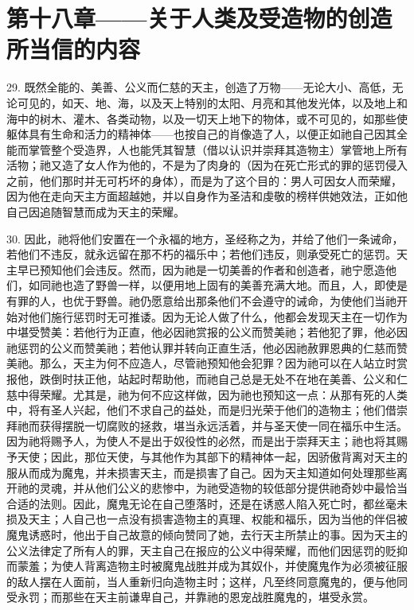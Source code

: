 
\section{第十八章——关于人类及受造物的创造所当信的内容}

29. 既然全能的、美善、公义而仁慈的天主，创造了万物——无论大小、高低，无论可见的，如天、地、海，以及天上特别的太阳、月亮和其他发光体，以及地上和海中的树木、灌木、各类动物，以及一切天上地下的物体，或不可见的，如那些使躯体具有生命和活力的精神体——也按自己的肖像造了人，以便正如祂自己因其全能而掌管整个受造界，人也能凭其智慧（借以认识并崇拜其造物主）掌管地上所有活物；祂又造了女人作为他的，不是为了肉身的（因为在死亡形式的罪的惩罚侵入之前，他们那时并无可朽坏的身体），而是为了这个目的：男人可因女人而荣耀，因为他在走向天主方面超越她，并以自身作为圣洁和虔敬的榜样供她效法，正如他自己因追随智慧而成为天主的荣耀。\par

30. 因此，祂将他们安置在一个永福的地方，圣经称之为，并给了他们一条诫命，若他们不违反，就永远留在那不朽的福乐中；若他们违反，则承受死亡的惩罚。天主早已预知他们会违反。然而，因为祂是一切美善的作者和创造者，祂宁愿造他们，如同祂也造了野兽一样，以便用地上固有的美善充满大地。而且，人，即使是有罪的人，也优于野兽。祂仍愿意给出那条他们不会遵守的诫命，为使他们当祂开始对他们施行惩罚时无可推诿。因为无论人做了什么，他都会发现天主在一切作为中堪受赞美：若他行为正直，他必因祂赏报的公义而赞美祂；若他犯了罪，他必因祂惩罚的公义而赞美祂；若他认罪并转向正直生活，他必因祂赦罪恩典的仁慈而赞美祂。那么，天主为何不应造人，尽管祂预知他会犯罪？因为祂可以在人站立时赏报他，跌倒时扶正他，站起时帮助他，而祂自己总是无处不在地在美善、公义和仁慈中得荣耀。尤其是，祂为何不应这样做，因为祂也预知这一点：从那有死的人类中，将有圣人兴起，他们不求自己的益处，而是归光荣于他们的造物主；他们借崇拜祂而获得摆脱一切腐败的拯救，堪当永远活着，并与圣天使一同在福乐中生活。因为祂将赐予人，为使人不是出于奴役性的必然，而是出于崇拜天主；祂也将其赐予天使；因此，那位天使，与其他作为其部下的精神体一起，因骄傲背离对天主的服从而成为魔鬼，并未损害天主，而是损害了自己。因为天主知道如何处理那些离开祂的灵魂，并从他们公义的悲惨中，为祂受造物的较低部分提供祂奇妙中最恰当合适的法则。因此，魔鬼无论在自己堕落时，还是在诱惑人陷入死亡时，都丝毫未损及天主；人自己也一点没有损害造物主的真理、权能和福乐，因为当他的伴侣被魔鬼诱惑时，他出于自己故意的倾向赞同了她，去行天主所禁止的事。因为天主的公义法律定了所有人的罪，天主自己在报应的公义中得荣耀，而他们因惩罚的贬抑而蒙羞；为使人背离造物主时被魔鬼战胜并成为其奴仆，并使魔鬼作为必须被征服的敌人摆在人面前，当人重新归向造物主时；这样，凡至终同意魔鬼的，便与他同受永罚；而那些在天主前谦卑自己，并靠祂的恩宠战胜魔鬼的，堪受永赏。\par

